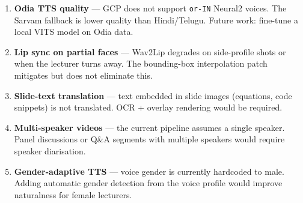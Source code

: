 \documentclass[12pt,a4paper]{article}
\begin{document}
\begin{enumerate}[leftmargin=*, label=\textbf{L\arabic*.}]
  \item \textbf{Odia TTS quality} — GCP does not support \texttt{or-IN}
        Neural2 voices.  The Sarvam fallback is lower quality than Hindi/Telugu.
        Future work: fine-tune a local VITS model on Odia data.

  \item \textbf{Lip sync on partial faces} — Wav2Lip degrades on side-profile
        shots or when the lecturer turns away.  The bounding-box interpolation
        patch mitigates but does not eliminate this.

  \item \textbf{Slide-text translation} — text embedded in slide images
        (equations, code snippets) is not translated.  OCR + overlay rendering
        would be required.

  \item \textbf{Multi-speaker videos} — the current pipeline assumes a single
        speaker.  Panel discussions or Q\&A segments with multiple speakers
        would require speaker diarisation.

  \item \textbf{Gender-adaptive TTS} — voice gender is currently hardcoded
        to male.  Adding automatic gender detection from the voice profile
        would improve naturalness for female lecturers.
\end{enumerate}
\end{document}
